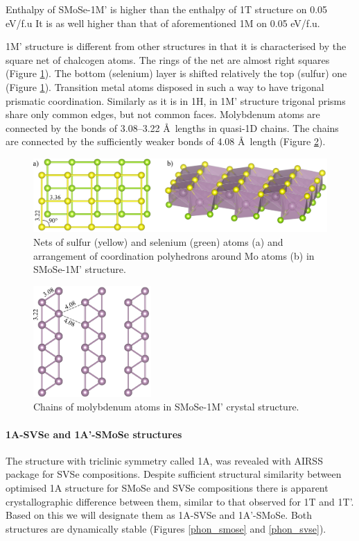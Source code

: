 \documentclass[a4paperm]{article}
\begin{document}
Enthalpy of SMoSe-1M' is higher than the enthalpy of 1T structure on 0.05 eV/f.u
It is as well higher than that of aforementioned 1M on 0.05 eV/f.u.

1M' structure is different from other structures in that it is characterised by the square net of chalcogen atoms.
The rings of the net are almost right squares (Figure \ref{H-hor}).
The bottom (selenium) layer is shifted relatively the top (sulfur) one (Figure \ref{H-hor}).
Transition metal atoms disposed in such a way to have trigonal prismatic coordination.
Similarly as it is in 1H, in 1M' structure trigonal prisms share only common edges, but not common faces.
Molybdenum atoms are connected by the bonds of 3.08--3.22 \AA\ lengths in quasi-1D chains.
The chains are connected by the sufficiently weaker bonds of 4.08 \AA\ length (Figure \ref{H-hor_Mo}).


\begin{figure}[H]
	\includegraphics[width=\textwidth]{H-hor.png}
	\caption{Nets of sulfur (yellow) and selenium (green) atoms (a) and arrangement of coordination polyhedrons around Mo atoms (b) in SMoSe-1M' structure.}
	\label{H-hor}
\end{figure} 


\begin{figure}[H]
	\includegraphics[width=0.4\textwidth]{H-hor_Mo.png}
	\caption{Chains of molybdenum atoms in SMoSe-1M' crystal structure.}
	\label{H-hor_Mo}
\end{figure} 


\paragraph{1A-SVSe and 1A'-SMoSe structures}
The structure with triclinic symmetry called 1A, was revealed with AIRSS package for SVSe compositions.
Despite sufficient structural similarity between optimised 1A structure for SMoSe and SVSe compositions there is apparent crystallographic difference between them, similar to that observed for 1T and 1T'.
Based on this we will designate them as 1A-SVSe and 1A'-SMoSe.
Both structures are dynamically stable (Figures \ref{phon_smose} and \ref{phon_svse}).
\end{document}
